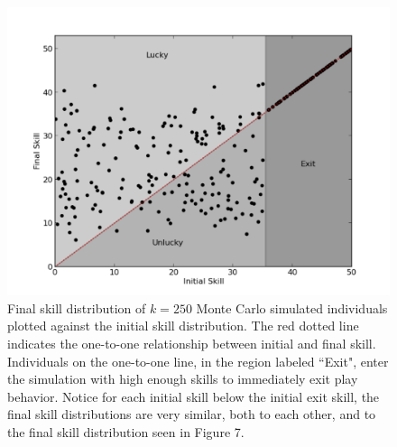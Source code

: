 \documentclass[12pt,letterpaper]{article}
\begin{document}
	\begin{figure}[h]
	\caption{Final skill distribution of $k=250$ Monte Carlo simulated individuals plotted against the initial skill distribution. The red dotted line indicates the one-to-one relationship between initial and final skill. Individuals on the one-to-one line, in the region labeled ``Exit", enter the simulation with high enough skills to immediately exit play behavior. Notice for each initial skill below the initial exit skill, the final skill distributions are very similar, both to each other, and to the final skill distribution seen in Figure 7. }
	\begin{center}
	\includegraphics[width=150mm]{mcmc2.pdf}
	\end{center}
	\label{mcmc}
	\end{figure}

	
\end{document}
